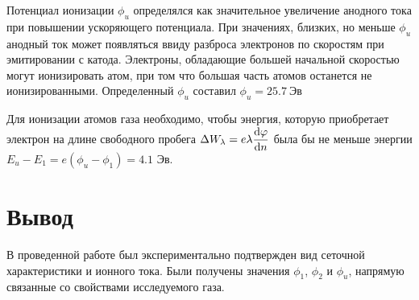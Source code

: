 Потенциал ионизации $\phi_u$ определялся как значительное увеличение анодного тока при повышении ускоряющего
потенциала. При значениях, близких, но меньше $\phi_u$ анодный ток может появляться ввиду разброса электронов по
скоростям при эмитировании с катода. Электроны, обладающие большей начальной скоростью могут ионизировать атом, при том
что большая часть атомов останется не ионизированными. Определенный $\phi_u$ составил $\phi_u=25.7\ \text{Эв}$ 

Для ионизации атомов газа необходимо, чтобы энергия, которую приобретает электрон на длине свободного пробега $\Delta W_{\lambda}=e\lambda \displaystyle\dv{\varphi}{n}$
была бы не меньше энергии $E_u-E_1=e(\phi_u-\phi_1)=4.1\text{ Эв}.$ 

\section{Вывод}
В проведенной работе был экспериментально подтвержден вид сеточной характеристики и ионного тока. Были получены значения
$\phi_1$, $\phi_2$ и $\phi_u$, напрямую связанные со свойствами исследуемого газа.
